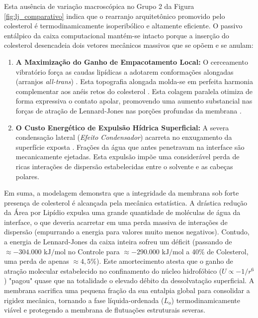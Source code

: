 \documentclass[12pt]{article} %
\begin{document}
Esta ausência de variação macroscópica no Grupo 2 da Figura \ref{fig:lj_comparativo} indica que o rearranjo arquitetônico promovido pelo colesterol é termodinamicamente isoperibólico e altamente eficiente. O passivo entálpico da caixa computacional mantém-se intacto porque a inserção do colesterol desencadeia dois vetores mecânicos massivos que se opõem e se anulam:

\begin{enumerate}
    \item \textbf{A Maximização do Ganho de Empacotamento Local:} O cerceamento vibratório força as caudas lipídicas a adotarem conformações alongadas (arranjos \textit{all-trans}) \cite{bennett2018}. Esta topografia alongada molda-se em perfeita harmonia complementar aos anéis retos do colesterol \cite{leeb2018}. Esta colagem paralela otimiza de forma expressiva o contato apolar, promovendo uma aumento substancial nas forças de atração de Lennard-Jones nas porções profundas da membrana \cite{bennett2018}.
    
    \item \textbf{O Custo Energético de Expulsão Hídrica Superficial:} A severa condensação lateral (\textit{Efeito Condensador}) acarreta no enxugamento da superfície exposta \cite{leeb2018}. Frações da água que antes penetravam na interface são mecanicamente ejetadas. Esta expulsão impõe uma considerável perda de ricas interações de dispersão estabelecidas entre o solvente e as cabeças polares.
\end{enumerate}

Em suma, a modelagem demonstra que a integridade da membrana sob forte presença de colesterol é alcançada pela mecânica estatística. A drástica redução da Área por Lipídio expulsa uma grande  quantidade de moléculas de água da interface, o que deveria acarretar em uma perda massiva de interações de dispersão (empurrando a energia para valores muito menos negativos). Contudo, a energia de Lennard-Jones da caixa inteira sofreu um déficit (passando de $\approx -304.000\text{ kJ/mol}$ no Controle para $\approx -290.000\text{ kJ/mol}$ a 40\% de Colesterol, uma perda de apenas $\approx 4,5\%$). Este amortecimento atesta que o ganho de atração molecular estabelecido no confinamento do núcleo hidrofóbico ($U \propto -1/r^6$) "pagou" quase que na totalidade o elevado débito da dessolvatação superficial. A membrana sacrifica uma pequena fração da sua entalpia global para consolidar a rigidez mecânica, tornando a fase líquida-ordenada ($L_o$) termodinamicamente viável e protegendo a membrana de flutuações estruturais severas.
\end{document}
